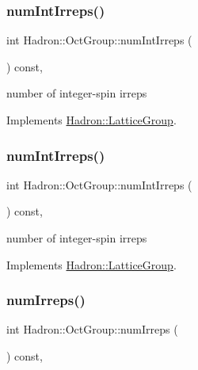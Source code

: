 \subsubsection{\texorpdfstring{numIntIrreps()}{numIntIrreps()}\hspace{0.1cm}{\footnotesize\ttfamily [2/3]}}
{\footnotesize\ttfamily int Hadron\+::\+Oct\+Group\+::num\+Int\+Irreps (\begin{DoxyParamCaption}{ }\end{DoxyParamCaption}) const\hspace{0.3cm}{\ttfamily [inline]}, {\ttfamily [virtual]}}

number of integer-\/spin irreps 

Implements \mbox{\hyperlink{structHadron_1_1LatticeGroup_af2aa7b39222bf188389356eefcef7547}{Hadron\+::\+Lattice\+Group}}.

\mbox{\label{structHadron_1_1OctGroup_abc0b88d4a62fb81c996b6638827cc187}} 
\subsubsection{\texorpdfstring{numIntIrreps()}{numIntIrreps()}\hspace{0.1cm}{\footnotesize\ttfamily [3/3]}}
{\footnotesize\ttfamily int Hadron\+::\+Oct\+Group\+::num\+Int\+Irreps (\begin{DoxyParamCaption}{ }\end{DoxyParamCaption}) const\hspace{0.3cm}{\ttfamily [inline]}, {\ttfamily [virtual]}}

number of integer-\/spin irreps 

Implements \mbox{\hyperlink{structHadron_1_1LatticeGroup_af2aa7b39222bf188389356eefcef7547}{Hadron\+::\+Lattice\+Group}}.

\mbox{\label{structHadron_1_1OctGroup_aed56aa6c4ed7e2a82048b478c916b9d2}} 
\subsubsection{\texorpdfstring{numIrreps()}{numIrreps()}\hspace{0.1cm}{\footnotesize\ttfamily [1/3]}}
{\footnotesize\ttfamily int Hadron\+::\+Oct\+Group\+::num\+Irreps (\begin{DoxyParamCaption}{ }\end{DoxyParamCaption}) const\hspace{0.3cm}{\ttfamily [inline]}, {\ttfamily [virtual]}}

